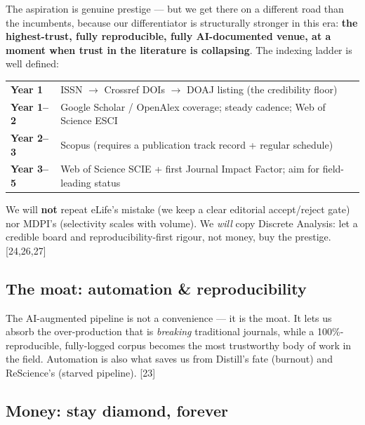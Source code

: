 \documentclass[11pt]{article}
\newcommand{\src}[1]{{\footnotesize\color{ink3}[#1]}}
\begin{document}
The aspiration is genuine prestige --- but we get there on a different road than the incumbents, because our differentiator is structurally stronger in this era: \textbf{the highest-trust, fully reproducible, fully AI-documented venue, at a moment when trust in the literature is collapsing}. The indexing ladder is well defined:
\begin{center}\small
\renewcommand{\arraystretch}{1.2}
\begin{tabular}{@{}ll@{}}
\textbf{Year 1} & ISSN $\to$ Crossref DOIs $\to$ DOAJ listing (the credibility floor) \\
\textbf{Year 1--2} & Google Scholar / OpenAlex coverage; steady cadence; Web of Science ESCI \\
\textbf{Year 2--3} & Scopus (requires a publication track record + regular schedule) \\
\textbf{Year 3--5} & Web of Science SCIE + first Journal Impact Factor; aim for field-leading status \\
\end{tabular}
\end{center}
We will \textbf{not} repeat eLife's mistake (we keep a clear editorial accept/reject gate) nor MDPI's (selectivity scales with volume). We \emph{will} copy Discrete Analysis: let a credible board and reproducibility-first rigour, not money, buy the prestige. \src{24,26,27}

\subsection{The moat: automation \& reproducibility}

The AI-augmented pipeline is not a convenience --- it is the moat. It lets us absorb the over-production that is \emph{breaking} traditional journals, while a 100\%-reproducible, fully-logged corpus becomes the most trustworthy body of work in the field. Automation is also what saves us from Distill's fate (burnout) and ReScience's (starved pipeline). \src{23}

\subsection{Money: stay diamond, forever}
\end{document}

